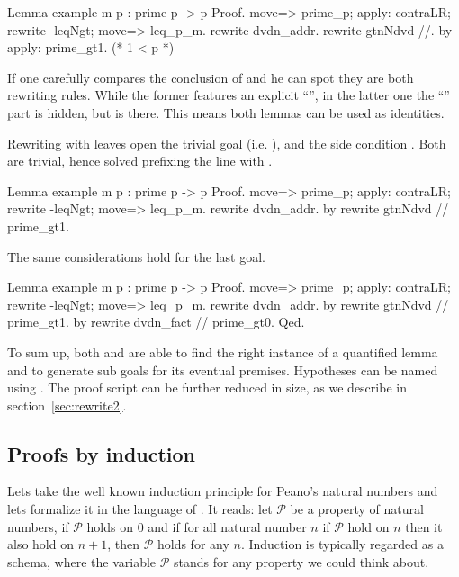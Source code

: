 \begin{coq}{}{}
Lemma example m p : prime p -> p %
Proof.
move=> prime_p; apply: contraLR; rewrite -leqNgt; move=> leq_p_m.
rewrite dvdn_addr.
  rewrite gtnNdvd //.
  by apply: prime_gt1.  (* 1 < p *)
\end{coq}
If one carefully compares the conclusion of  and
 he can spot they are both rewriting rules.  While
the former features an explicit ``'', in the
latter one the ``'' part is hidden, but is there.
This means
both lemmas can be used as identities.


Rewriting with
 leaves open the trivial goal  (i.e. ),
and the side condition .  Both are trivial, hence
solved prefixing the line with .

\begin{coq}{}{}
Lemma example m p : prime p -> p %
Proof.
move=> prime_p; apply: contraLR; rewrite -leqNgt; move=> leq_p_m.
rewrite dvdn_addr.
  by rewrite gtnNdvd // prime_gt1.
\end{coq}
The same considerations hold for the last goal.

\begin{coq}{}{}
Lemma example m p : prime p -> p %
Proof.
move=> prime_p; apply: contraLR; rewrite -leqNgt; move=> leq_p_m.
rewrite dvdn_addr.
  by rewrite gtnNdvd // prime_gt1.
by rewrite dvdn_fact // prime_gt0.
Qed.
\end{coq}

To sum up, both  and  are able to find the right
instance of a quantified lemma and to generate sub goals
for its eventual premises.  Hypotheses can be named using .
The proof script can be further reduced in size, as we describe in
section~\ref{sec:rewrite2}.

\subsection{Proofs by induction}\label{ssec:ind}

Lets take the well known induction principle for Peano's natural numbers
and lets formalize it in the language of \Coq{}.  It reads:
let $\mathcal{P}$ be a property of natural numbers, if
$\mathcal{P}$ holds on $0$ and if for all natural number $n$
if $\mathcal{P}$ hold on $n$ then it also hold on $n+1$, then $\mathcal{P}$
holds for any $n$.  Induction is typically regarded as a schema, where
the variable $\mathcal{P}$ stands for any property we could think about.

